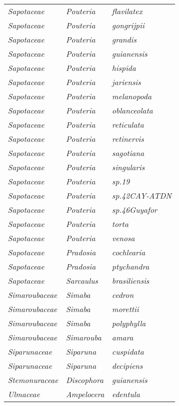 \documentclass[fleqn,10pt]{ArtEcoFoG} %
\renewenvironment{table}{\begin{table*}}{\end{table*}\ignorespacesafterend}
\begin{document}
\begin{table}
\begin{tabular}[t]{lll}
\em{Sapotaceae} & \em{Pouteria} & \em{flavilatex}\\
\addlinespace
\em{Sapotaceae} & \em{Pouteria} & \em{gongrijpii}\\
\em{Sapotaceae} & \em{Pouteria} & \em{grandis}\\
\em{Sapotaceae} & \em{Pouteria} & \em{guianensis}\\
\em{Sapotaceae} & \em{Pouteria} & \em{hispida}\\
\em{Sapotaceae} & \em{Pouteria} & \em{jariensis}\\
\addlinespace
\em{Sapotaceae} & \em{Pouteria} & \em{melanopoda}\\
\em{Sapotaceae} & \em{Pouteria} & \em{oblanceolata}\\
\em{Sapotaceae} & \em{Pouteria} & \em{reticulata}\\
\em{Sapotaceae} & \em{Pouteria} & \em{retinervis}\\
\em{Sapotaceae} & \em{Pouteria} & \em{sagotiana}\\
\addlinespace
\em{Sapotaceae} & \em{Pouteria} & \em{singularis}\\
\em{Sapotaceae} & \em{Pouteria} & \em{sp.19}\\
\em{Sapotaceae} & \em{Pouteria} & \em{sp.42CAY-ATDN}\\
\em{Sapotaceae} & \em{Pouteria} & \em{sp.46Guyafor}\\
\em{Sapotaceae} & \em{Pouteria} & \em{torta}\\
\addlinespace
\em{Sapotaceae} & \em{Pouteria} & \em{venosa}\\
\em{Sapotaceae} & \em{Pradosia} & \em{cochlearia}\\
\em{Sapotaceae} & \em{Pradosia} & \em{ptychandra}\\
\em{Sapotaceae} & \em{Sarcaulus} & \em{brasiliensis}\\
\em{Simaroubaceae} & \em{Simaba} & \em{cedron}\\
\addlinespace
\em{Simaroubaceae} & \em{Simaba} & \em{morettii}\\
\em{Simaroubaceae} & \em{Simaba} & \em{polyphylla}\\
\em{Simaroubaceae} & \em{Simarouba} & \em{amara}\\
\em{Siparunaceae} & \em{Siparuna} & \em{cuspidata}\\
\em{Siparunaceae} & \em{Siparuna} & \em{decipiens}\\
\addlinespace
\em{Stemonuraceae} & \em{Discophora} & \em{guianensis}\\
\em{Ulmaceae} & \em{Ampelocera} & \em{edentula}\\

\end{tabular}
\end{table}
\end{document}
